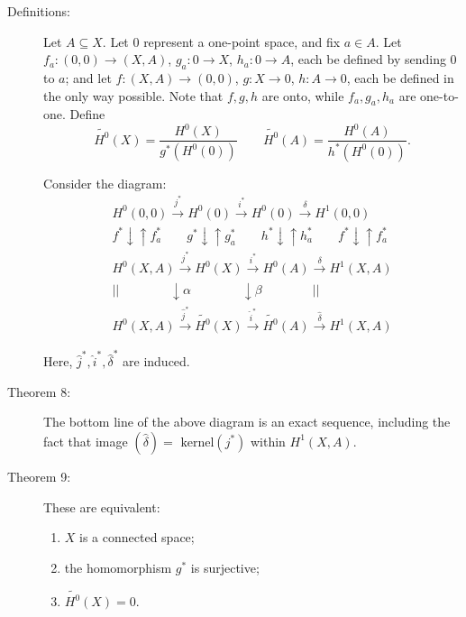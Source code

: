 \documentclass{article}
\begin{document}
\begin{description}

\item[Definitions:] Let $A \subseteq X$. Let $0$ represent a one-point space, and fix $a \in A$. Let $f_a: (0,0) \rightarrow (X,A)$, $g_a: 0 \rightarrow X$, $h_a: 0 \rightarrow A$, each be defined by sending $0$ to $a$; and let $f: (X,A) \rightarrow (0,0)$, $g: X \rightarrow 0$, $h: A \rightarrow 0$, each be defined in the only way possible. Note that $f,g,h$ are onto, while $f_a,g_a,h_a$ are one-to-one. Define
  \begin{equation*}
  \widetilde{H^0}(X) = \frac{H^0(X)}{g^*(H^0(0))} \quad\quad \widetilde{H^0}(A) = \frac{H^0(A)}{h^*(H^0(0))}.
  \end{equation*}

  Consider the diagram:
  \begin{gather*}
  H^0(0,0) \xrightarrow{\ j^* \ } H^0(0) \xrightarrow{\ i^* \ } H^0(0)  \xrightarrow{\ \delta \ } H^1(0,0) \\
  f^* \downarrow \uparrow f_a^* \quad \quad g^* \downarrow \uparrow g_a^* \quad \quad h^* \downarrow \uparrow h_a^* \quad \quad f^* \downarrow \uparrow f_a^* \\
  H^0(X,A) \xrightarrow{\ j^* \ } H^0(X) \xrightarrow{\ i^* \ } H^0(A) \xrightarrow{\ \delta \ } H^1(X,A) \\
  \vert \vert \quad\quad\quad\quad \downarrow \alpha \quad\quad\quad\quad \downarrow \beta \quad\quad\quad\quad \vert \vert \\
  H^0(X,A)  \xrightarrow{\ \hat{j}^* \ } \widetilde{H^0}(X) \xrightarrow{\ \hat{i}^* \ } \widetilde{H^0}(A)  \xrightarrow{\ \hat{\delta} \ } H^1(X,A)
  \end{gather*}

  Here, $\hat{j}^*, \hat{i}^*, \hat{\delta}^*$ are induced.

\item[Theorem 8:] The bottom line of the above diagram is an exact sequence, including the fact that image $(\hat{\delta}) = \text{ kernel}(j^*)$ within $H^1(X,A)$.

\item[Theorem 9:] These are equivalent:
  \begin{enumerate}[\hspace{1cm}(1)]
    \item $X$ is a connected space;
    \item the homomorphism $g^*$ is surjective;
    \item $\widetilde{H^0}(X)=0$.
  \end{enumerate}

\end{description}
\end{document}
